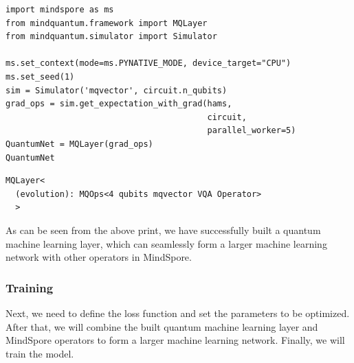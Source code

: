 \begin{lstlisting}
import mindspore as ms                                                                         
from mindquantum.framework import MQLayer                                                      
from mindquantum.simulator import Simulator

ms.set_context(mode=ms.PYNATIVE_MODE, device_target="CPU")
ms.set_seed(1)                                                                                 
sim = Simulator('mqvector', circuit.n_qubits)
grad_ops = sim.get_expectation_with_grad(hams,
                                         circuit,
                                         parallel_worker=5)
QuantumNet = MQLayer(grad_ops)          
QuantumNet
\end{lstlisting}

\begin{lstlisting}
MQLayer<
  (evolution): MQOps<4 qubits mqvector VQA Operator>
  >
\end{lstlisting}

As can be seen from the above print, we have successfully built a quantum machine learning layer, which can seamlessly form a larger machine learning network with other operators in MindSpore.

\subsubsection{Training}
Next, we need to define the loss function and set the parameters to be optimized. After that, we will combine the built quantum machine learning layer and MindSpore operators to form a larger machine learning network. Finally, we will train the model. %


